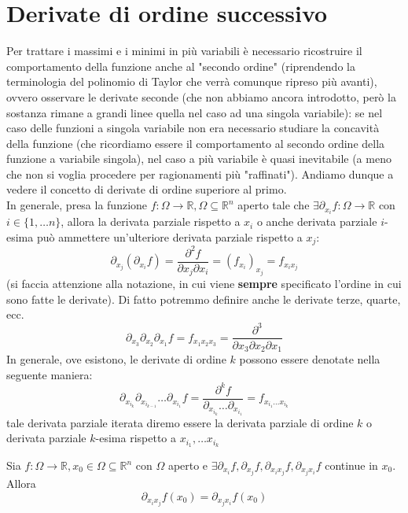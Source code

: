 \section{Derivate di ordine successivo}
Per trattare i massimi e i minimi in più variabili è necessario ricostruire il comportamento della funzione anche al "secondo ordine" (riprendendo la terminologia del polinomio di Taylor che verrà comunque ripreso più avanti), ovvero osservare le derivate seconde (che non abbiamo ancora introdotto, però la sostanza rimane a grandi linee quella nel caso ad una singola variabile): se nel caso delle funzioni a singola variabile non era necessario studiare la concavità della funzione (che ricordiamo essere il comportamento al secondo ordine della funzione a variabile singola), nel caso a più variabile è quasi inevitabile (a meno che non si voglia procedere per ragionamenti più "raffinati"). Andiamo dunque a vedere il concetto di derivate di ordine superiore al primo. \\
In generale, presa la funzione $f: \Omega \to \mathbb{R}, \Omega \subseteq \mathbb{R}^n$ aperto tale che $\exists \partial_{x_i}f: \Omega \to \mathbb{R}$ con $i \in \{ 1, \ldots n \}$, allora la derivata parziale rispetto a $x_i$ o anche derivata parziale $i$-esima può ammettere un'ulteriore derivata parziale rispetto a $x_j$:
$$
\partial_{x_j}(\partial_{x_i} f) = \frac{\partial^2 f}{\partial x_j \partial x_i} = (f_{x_i})_{x_j} = f_{x_i x_j}
$$
(si faccia attenzione alla notazione, in cui viene \textbf{sempre} specificato l'ordine in cui sono fatte le derivate). Di fatto potremmo definire anche le derivate terze, quarte, ecc.
$$
\partial_{x_3} \partial_{x_2} \partial_{x_1} f = f_{x_1 x_2 x_3} = \frac{\partial^3}{\partial x_3 \partial x_2 \partial x_1}
$$
In generale, ove esistono, le derivate di ordine $k$ possono essere denotate nella seguente maniera:
$$
\partial_{x_{i_k}} \partial_{x_{i_{k-1}}} \ldots \partial_{x_{i_1}} f = \frac{\partial^k f}{\partial_{x_{i_k}} \ldots \partial_{x_{i_1}}} = f_{x_{i_1} \ldots x_{i_k}}
$$
tale derivata parziale iterata diremo essere la derivata parziale di ordine $k$ o derivata parziale $k$-esima rispetto a $x_{i_1}, \ldots x_{i_k}$
\begin{theorem}[di Schwarz]
Sia $f:\Omega \to \mathbb{R}, x_0 \in \Omega \subseteq \mathbb{R}^n$ con $\Omega$ aperto e $\exists \partial_{x_i} f, \partial_{x_j} f, \partial_{x_i x_j} f, \partial_{x_j x_i} f$ continue in $x_0$. Allora
$$
\partial_{x_i x_j} f(x_0) = \partial_{x_j x_i} f(x_0)
$$
\end{theorem}
